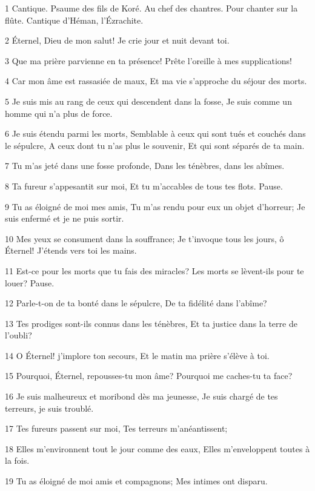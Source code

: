 \par 1 Cantique. Psaume des fils de Koré. Au chef des chantres. Pour chanter sur la flûte. Cantique d'Héman, l'Ézrachite.
\par 2 Éternel, Dieu de mon salut! Je crie jour et nuit devant toi.
\par 3 Que ma prière parvienne en ta présence! Prête l'oreille à mes supplications!
\par 4 Car mon âme est rassasiée de maux, Et ma vie s'approche du séjour des morts.
\par 5 Je suis mis au rang de ceux qui descendent dans la fosse, Je suis comme un homme qui n'a plus de force.
\par 6 Je suis étendu parmi les morts, Semblable à ceux qui sont tués et couchés dans le sépulcre, A ceux dont tu n'as plus le souvenir, Et qui sont séparés de ta main.
\par 7 Tu m'as jeté dans une fosse profonde, Dans les ténèbres, dans les abîmes.
\par 8 Ta fureur s'appesantit sur moi, Et tu m'accables de tous tes flots. Pause.
\par 9 Tu as éloigné de moi mes amis, Tu m'as rendu pour eux un objet d'horreur; Je suis enfermé et je ne puis sortir.
\par 10 Mes yeux se consument dans la souffrance; Je t'invoque tous les jours, ô Éternel! J'étends vers toi les mains.
\par 11 Est-ce pour les morts que tu fais des miracles? Les morts se lèvent-ils pour te louer? Pause.
\par 12 Parle-t-on de ta bonté dans le sépulcre, De ta fidélité dans l'abîme?
\par 13 Tes prodiges sont-ils connus dans les ténèbres, Et ta justice dans la terre de l'oubli?
\par 14 O Éternel! j'implore ton secours, Et le matin ma prière s'élève à toi.
\par 15 Pourquoi, Éternel, repousses-tu mon âme? Pourquoi me caches-tu ta face?
\par 16 Je suis malheureux et moribond dès ma jeunesse, Je suis chargé de tes terreurs, je suis troublé.
\par 17 Tes fureurs passent sur moi, Tes terreurs m'anéantissent;
\par 18 Elles m'environnent tout le jour comme des eaux, Elles m'enveloppent toutes à la fois.
\par 19 Tu as éloigné de moi amis et compagnons; Mes intimes ont disparu.

